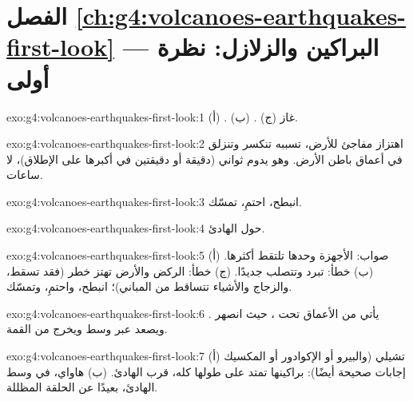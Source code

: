 \section*{الفصل \ref{ch:g4:volcanoes-earthquakes-first-look} --- البراكين والزلازل: نظرة أولى}

\begin{solution}{exo:g4:volcanoes-earthquakes-first-look:1}
(أ) . (ب) . (ج) غاز.
\end{solution}

\begin{solution}{exo:g4:volcanoes-earthquakes-first-look:2}
 اهتزاز مفاجئ للأرض، تسببه  تنكسر وتنزلق في أعماق باطن
الأرض. وهو يدوم ثواني (دقيقة أو دقيقتين في أكبرها على الإطلاق)، لا
ساعات.
\end{solution}

\begin{solution}{exo:g4:volcanoes-earthquakes-first-look:3}
انبطح، احتمِ، تمسّك.
\end{solution}

\begin{solution}{exo:g4:volcanoes-earthquakes-first-look:4}
حول  الهادئ.
\end{solution}

\begin{solution}{exo:g4:volcanoes-earthquakes-first-look:5}
(أ) صواب: الأجهزة وحدها تلتقط أكثرها. (ب) خطأ:  تبرد
وتتصلب  جديدًا. (ج) خطأ: الركض والأرض تهتز خطر (فقد تسقط،
والزجاج والأشياء تتساقط من المباني)؛ انبطح، واحتمِ،
وتمسّك.
\end{solution}

\begin{solution}{exo:g4:volcanoes-earthquakes-first-look:6}
يأتي من الأعماق تحت ، حيث انصهر . ويصعد عبر وسط 
ويخرج من القمة.
\end{solution}

\begin{solution}{exo:g4:volcanoes-earthquakes-first-look:7}
(أ) تشيلي (والبيرو أو الإكوادور أو المكسيك إجابات صحيحة أيضًا): براكينها
تمتد على طولها كله، قرب   الهادئ. (ب) هاواي، في وسط
 الهادئ، بعيدًا عن الحلقة المظللة.
\end{solution}

